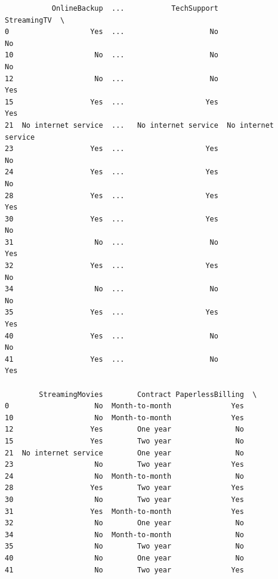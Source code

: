 \documentclass[8pt,onecolumn,aps,pra]{revtex4-1}
\begin{document}
\begin{verbatim}
           OnlineBackup  ...           TechSupport          StreamingTV  \
0                   Yes  ...                    No                   No   
10                   No  ...                    No                   No   
12                   No  ...                    No                  Yes   
15                  Yes  ...                   Yes                  Yes   
21  No internet service  ...   No internet service  No internet service   
23                  Yes  ...                   Yes                   No   
24                  Yes  ...                   Yes                   No   
28                  Yes  ...                   Yes                  Yes   
30                  Yes  ...                   Yes                   No   
31                   No  ...                    No                  Yes   
32                  Yes  ...                   Yes                   No   
34                   No  ...                    No                   No   
35                  Yes  ...                   Yes                  Yes   
40                  Yes  ...                    No                   No   
41                  Yes  ...                    No                  Yes   

        StreamingMovies        Contract PaperlessBilling  \
0                    No  Month-to-month              Yes   
10                   No  Month-to-month              Yes   
12                  Yes        One year               No   
15                  Yes        Two year               No   
21  No internet service        One year               No   
23                   No        Two year              Yes   
24                   No  Month-to-month               No   
28                  Yes        Two year              Yes   
30                   No        Two year              Yes   
31                  Yes  Month-to-month              Yes   
32                   No        One year               No   
34                   No  Month-to-month               No   
35                   No        Two year               No   
40                   No        One year               No   
41                   No        Two year              Yes   


\end{verbatim}
\end{document}
